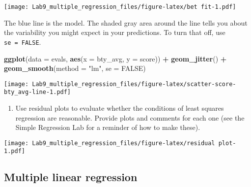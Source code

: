 \documentclass[
]{article}
\newenvironment{Shaded}{\begin{snugshade}}{\end{snugshade}}
\newcommand{\AttributeTok}[1]{\textcolor[rgb]{0.13,0.29,0.53}{#1}}
\newcommand{\ConstantTok}[1]{\textcolor[rgb]{0.56,0.35,0.01}{#1}}
\newcommand{\DecValTok}[1]{\textcolor[rgb]{0.00,0.00,0.81}{#1}}
\newcommand{\FunctionTok}[1]{\textcolor[rgb]{0.13,0.29,0.53}{\textbf{#1}}}
\newcommand{\NormalTok}[1]{#1}
\newcommand{\SpecialCharTok}[1]{\textcolor[rgb]{0.81,0.36,0.00}{\textbf{#1}}}
\newcommand{\StringTok}[1]{\textcolor[rgb]{0.31,0.60,0.02}{#1}}
\providecommand{\tightlist}{%
  \setlength{\itemsep}{0pt}\setlength{\parskip}{0pt}}
\begin{document}
\texttt{[image: Lab9\_multiple\_regression\_files/figure-latex/bet fit-1.pdf]}

The blue line is the model. The shaded gray area around the line tells
you about the variability you might expect in your predictions. To turn
that off, use \texttt{se\ =\ FALSE}.

\begin{Shaded}
\begin{Highlighting}[]
\FunctionTok{ggplot}\NormalTok{(}\AttributeTok{data =}\NormalTok{ evals, }\FunctionTok{aes}\NormalTok{(}\AttributeTok{x =}\NormalTok{ bty\_avg, }\AttributeTok{y =}\NormalTok{ score)) }\SpecialCharTok{+}
  \FunctionTok{geom\_jitter}\NormalTok{() }\SpecialCharTok{+}
  \FunctionTok{geom\_smooth}\NormalTok{(}\AttributeTok{method =} \StringTok{"lm"}\NormalTok{, }\AttributeTok{se =} \ConstantTok{FALSE}\NormalTok{)}
\end{Highlighting}
\end{Shaded}

\texttt{[image: Lab9\_multiple\_regression\_files/figure-latex/scatter-score-bty\_avg-line-1.pdf]}

\begin{enumerate}
\def\labelenumi{\arabic{enumi}.}
\setcounter{enumi}{5}
\tightlist
\item
  Use residual plots to evaluate whether the conditions of least squares
  regression are reasonable. Provide plots and comments for each one
  (see the Simple Regression Lab for a reminder of how to make these).
\end{enumerate}

\begin{Shaded}
\end{Shaded}

\texttt{[image: Lab9\_multiple\_regression\_files/figure-latex/residual plot-1.pdf]}

\subsection{Multiple linear
regression}\label{multiple-linear-regression}
\end{document}
